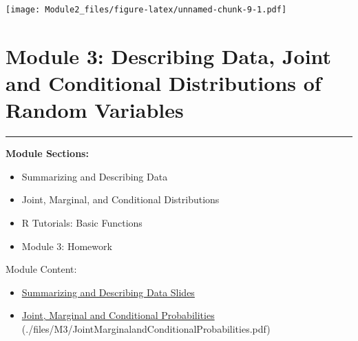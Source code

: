\documentclass[]{book}
\newenvironment{Shaded}{\begin{snugshade}}{\end{snugshade}}
\newcommand{\KeywordTok}[1]{\textcolor[rgb]{0.13,0.29,0.53}{\textbf{#1}}}
\newcommand{\DataTypeTok}[1]{\textcolor[rgb]{0.13,0.29,0.53}{#1}}
\newcommand{\StringTok}[1]{\textcolor[rgb]{0.31,0.60,0.02}{#1}}
\newcommand{\OperatorTok}[1]{\textcolor[rgb]{0.81,0.36,0.00}{\textbf{#1}}}
\newcommand{\NormalTok}[1]{#1}
\providecommand{\tightlist}{%
  \setlength{\itemsep}{0pt}\setlength{\parskip}{0pt}}
\theoremstyle{definition}
\theoremstyle{definition}
\theoremstyle{definition}
\theoremstyle{remark}
\begin{document}
\begin{Shaded}
\end{Shaded}

\texttt{[image: Module2\_files/figure-latex/unnamed-chunk-9-1.pdf]}

\chapter{Module 3: Describing Data, Joint and Conditional Distributions
of Random
Variables}\label{module-3-describing-data-joint-and-conditional-distributions-of-random-variables}

\begin{center}\rule{0.5\linewidth}{\linethickness}\end{center}

\textbf{Module Sections:}

\begin{itemize}
\tightlist
\item
  Summarizing and Describing Data
\item
  Joint, Marginal, and Conditional Distributions
\item
  R Tutorials: Basic Functions
\item
  Module 3: Homework
\end{itemize}

Module Content:

\begin{itemize}
\tightlist
\item
  \href{./files/M3/SummarizingandDescribingDataSlides.pdf}{Summarizing
  and Describing Data Slides}
\item
  \protect\hyperlink{joint-marginal-and-conditional-probabilities}{Joint,
  Marginal and Conditional Probabilities}
  (./files/M3/JointMarginalandConditionalProbabilities.pdf)
\end{itemize}
\end{document}
